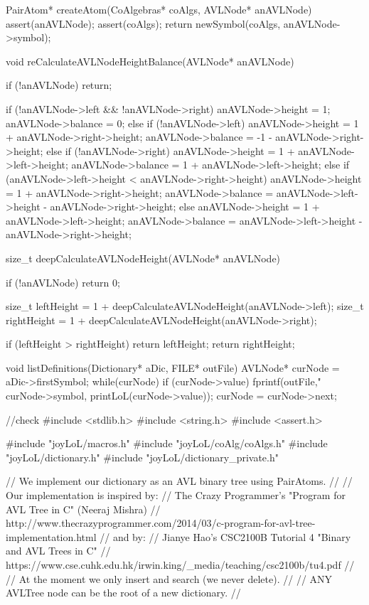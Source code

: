 PairAtom* createAtom(CoAlgebras* coAlgs, AVLNode* anAVLNode) {
  assert(anAVLNode);
  assert(coAlgs);
  return newSymbol(coAlgs, anAVLNode->symbol);
}

void reCalculateAVLNodeHeightBalance(AVLNode* anAVLNode) {
  if (!anAVLNode) return;

  if (!anAVLNode->left && !anAVLNode->right) {
    anAVLNode->height  = 1;
    anAVLNode->balance = 0;
  } else if (!anAVLNode->left) {
    anAVLNode->height  =  1 + anAVLNode->right->height;
    anAVLNode->balance = -1 - anAVLNode->right->height;
  } else if (!anAVLNode->right) {
    anAVLNode->height  = 1 + anAVLNode->left->height;
    anAVLNode->balance = 1 + anAVLNode->left->height;
  } else if (anAVLNode->left->height < anAVLNode->right->height) {
    anAVLNode->height  = 1 + anAVLNode->right->height;
    anAVLNode->balance = anAVLNode->left->height - anAVLNode->right->height;
  } else {
    anAVLNode->height  = 1 + anAVLNode->left->height;
    anAVLNode->balance = anAVLNode->left->height - anAVLNode->right->height;
  }
}

size_t deepCalculateAVLNodeHeight(AVLNode* anAVLNode) {
  if (!anAVLNode) return 0;

  size_t leftHeight = 1 + deepCalculateAVLNodeHeight(anAVLNode->left);
  size_t rightHeight = 1 + deepCalculateAVLNodeHeight(anAVLNode->right);

  if (leftHeight > rightHeight) return leftHeight;
  return rightHeight;
}

void listDefinitions(Dictionary* aDic, FILE* outFile) {
  AVLNode* curNode = aDic->firstSymbol;
  while(curNode) {
    if (curNode->value) {
      fprintf(outFile,"%
              curNode->symbol, printLoL(curNode->value));
    }
    curNode = curNode->next;
  }
}

\stoptyping

\starttyping
//check
#include <stdlib.h>
#include <string.h>
#include <assert.h>

#include "joyLoL/macros.h"
#include "joyLoL/coAlg/coAlgs.h"
#include "joyLoL/dictionary.h"
#include "joyLoL/dictionary_private.h"

// We implement our dictionary as an AVL binary tree using PairAtoms.
//
// Our implementation is inspired by:
// The Crazy Programmer's "Program for AVL Tree in C" (Neeraj Mishra)
// http://www.thecrazyprogrammer.com/2014/03/c-program-for-avl-tree-implementation.html
// and by:
// Jianye Hao's CSC2100B Tutorial 4 "Binary and AVL Trees in C"
// https://www.cse.cuhk.edu.hk/irwin.king/_media/teaching/csc2100b/tu4.pdf
//
// At the moment we only insert and search (we never delete).
//
// ANY AVLTree node can be the root of a new dictionary.
//

